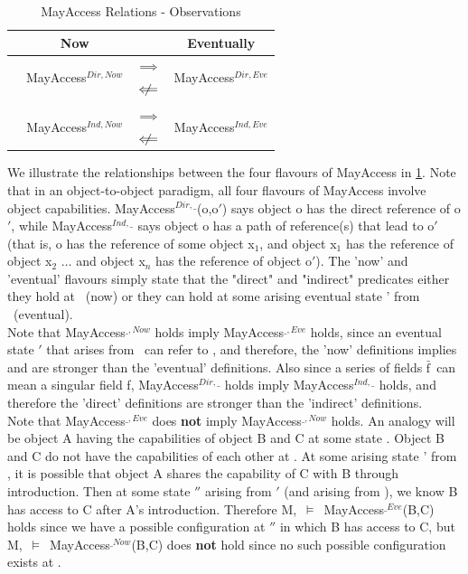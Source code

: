 \documentclass[a4paper,11pt,twoside]{article}
\newcommand*\rot{\rotatebox{90}}
\newcommand{\loimplies}{$\implies$}
\newcommand{\lonimplies}{$\centernot\implies$}
\newcommand{\loimpliedby}{$\Longleftarrow$}
\newcommand{\lonimpliedby}{$\centernot\Longleftarrow$}
\newcommand{\losigma}{\text{$\upsigma$}}
\newcommand{\loturns} {$\vDash$}
\newcommand{\loconj}[1] {$\bar{\text{#1}}$}
\begin{document}
\begin{table}[htb]
\caption{MayAccess Relations - Observations}\label{tab:accessrelations}
\centering
\begin{tabular*}{0.5\linewidth}{c|ccc}\toprule
& \bf Now & & \bf Eventually\\
\hline
\multirow{5}{*}{\rot{\bf Indirect \enspace Direct \:}} & \multirow{2}{*}{MayAccess$^{Dir,Now}$} & \loimplies & \multirow{2}{*}{MayAccess$^{Dir, Eve}$} \\
& & \lonimpliedby &  \\
& \rot{\loimpliedby} \rot{\lonimplies}& &\rot{\loimpliedby} \rot{\lonimplies} \\
& \multirow{2}{*}{MayAccess$^{Ind,Now}$} & \loimplies & \multirow{2}{*}{MayAccess$^{Ind, Eve}$} \\
& & \lonimpliedby &\\
\end{tabular*}
\end{table}

We illustrate the relationships between the four flavours of MayAccess in \cref{tab:accessrelations}. Note that in an object-to-object paradigm, all four flavours of MayAccess involve object capabilities. MayAccess$^{Dir,\_}$(o,o$'$) says object o has the direct reference of o$'$, while MayAccess$^{Ind,\_}$ says object o has a path of reference(s) that lead to o$'$ (that is, o has the reference of some object x$_1$, and object x$_1$ has the reference of object x$_2$ $\dots$ and object x$_n$ has the reference of object o$'$). The 'now' and 'eventual' flavours simply state that the "direct" and "indirect" predicates either they hold at \losigma\ (now) or they can hold at some arising eventual state \losigma' from \losigma\ (eventual).\\

Note that MayAccess$^{\_,Now}$ holds imply MayAccess$^{\_,Eve}$ holds, since an eventual state \losigma$'$ that arises from \losigma\, can refer to \losigma, and therefore, the 'now' definitions implies and are stronger than the 'eventual' definitions. Also since a series of fields \loconj{f}\ can mean a singular field f, MayAccess$^{Dir,\_}$ holds imply MayAccess$^{Ind,\_}$ holds, and therefore the 'direct' definitions are stronger than the 'indirect' definitions. \\

Note that MayAccess$^{\_,Eve}$ does \textbf{not} imply MayAccess$^{\_,Now}$ holds. An analogy will be object A having the capabilities of object B and C at some state \losigma. Object B and C do not have the capabilities of each other at \losigma. At some arising state \losigma' from \losigma, it is possible that object A shares the capability of C with B through introduction. Then at some state \losigma$''$ arising from \losigma$'$ (and arising from \losigma), we know B has access to C after A's introduction. Therefore M,\losigma\ \loturns\ MayAccess$^{\_Eve}$(B,C) holds since we have a possible configuration at \losigma$''$ in which B has access to C, but M,\losigma\ \loturns\ MayAccess$^{\_Now}$(B,C) does \textbf{not} hold since no such possible configuration exists at \losigma.\\
\end{document}
